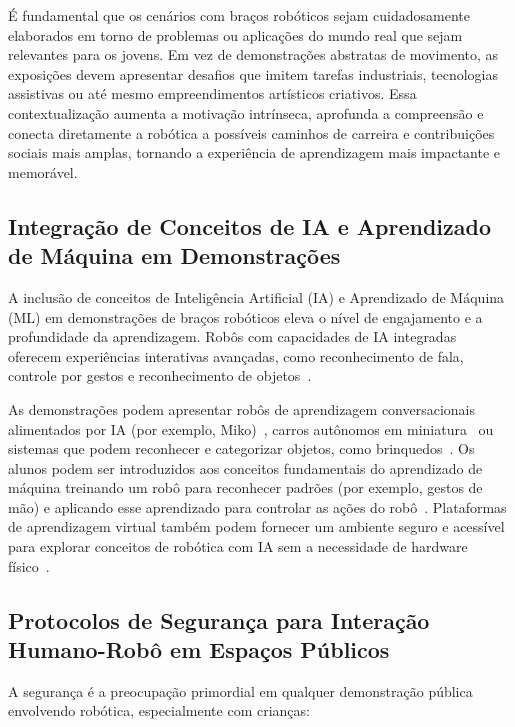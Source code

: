 \documentclass[%
  a4paper,%
  12pt,%
  fleqn,%
  english,%
  brazilian,%
]{article}
\begin{document}
É fundamental que os cenários com braços robóticos sejam cuidadosamente elaborados em torno de problemas ou aplicações do mundo real que sejam relevantes para os jovens. Em vez de demonstrações abstratas de movimento, as exposições devem apresentar desafios que imitem tarefas industriais, tecnologias assistivas ou até mesmo empreendimentos artísticos criativos. Essa contextualização aumenta a motivação intrínseca, aprofunda a compreensão e conecta diretamente a robótica a possíveis caminhos de carreira e contribuições sociais mais amplas, tornando a experiência de aprendizagem mais impactante e memorável.


\subsection{Integração de Conceitos de IA e Aprendizado de Máquina em Demonstrações}
A inclusão de conceitos de Inteligência Artificial (IA) e Aprendizado de Máquina (ML) em demonstrações de braços robóticos eleva o nível de engajamento e a profundidade da aprendizagem. Robôs com capacidades de IA integradas oferecem experiências interativas avançadas, como reconhecimento de fala, controle por gestos e reconhecimento de objetos~\cite{vexRoboticsHome2025}.

As demonstrações podem apresentar robôs de aprendizagem conversacionais alimentados por IA (por exemplo, Miko)~\cite{mikoAIPoweredRobot2025}, carros autônomos em miniatura~\cite{stempediaProjects2025} ou sistemas que podem reconhecer e categorizar objetos, como brinquedos~\cite{stempediaProjects2025}. Os alunos podem ser introduzidos aos conceitos fundamentais do aprendizado de máquina treinando um robô para reconhecer padrões (por exemplo, gestos de mão) e aplicando esse aprendizado para controlar as ações do robô~\cite{stempediaProjects2025}. Plataformas de aprendizagem virtual também podem fornecer um ambiente seguro e acessível para explorar conceitos de robótica com IA sem a necessidade de hardware físico~\cite{coderoboPickPlace2025}.

\subsection{Protocolos de Segurança para Interação Humano-Robô em Espaços Públicos}
A segurança é a preocupação primordial em qualquer demonstração pública envolvendo robótica, especialmente com crianças:
\end{document}
